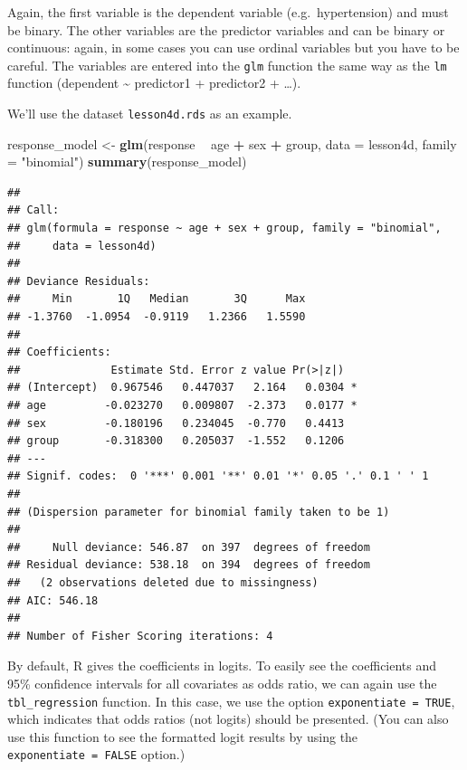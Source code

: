 \documentclass[]{book}
\newenvironment{Shaded}{\begin{snugshade}}{\end{snugshade}}
\newcommand{\DataTypeTok}[1]{\textcolor[rgb]{0.13,0.29,0.53}{#1}}
\newcommand{\KeywordTok}[1]{\textcolor[rgb]{0.13,0.29,0.53}{\textbf{#1}}}
\newcommand{\NormalTok}[1]{#1}
\newcommand{\OperatorTok}[1]{\textcolor[rgb]{0.81,0.36,0.00}{\textbf{#1}}}
\newcommand{\StringTok}[1]{\textcolor[rgb]{0.31,0.60,0.02}{#1}}
\begin{document}
Again, the first variable is the dependent variable (e.g.~hypertension) and must be binary. The other variables are the predictor variables and can be binary or continuous: again, in some cases you can use ordinal variables but you have to be careful. The variables are entered into the \texttt{glm} function the same way as the \texttt{lm} function (dependent \textasciitilde{} predictor1 + predictor2 + \ldots).

We'll use the dataset \texttt{lesson4d.rds} as an example.

\begin{Shaded}
\begin{Highlighting}[]
\NormalTok{response_model <-}\StringTok{ }\KeywordTok{glm}\NormalTok{(response }\OperatorTok{~}\StringTok{ }\NormalTok{age }\OperatorTok{+}\StringTok{ }\NormalTok{sex }\OperatorTok{+}\StringTok{ }\NormalTok{group, }\DataTypeTok{data =}\NormalTok{ lesson4d, }\DataTypeTok{family =} \StringTok{"binomial"}\NormalTok{)}
\KeywordTok{summary}\NormalTok{(response_model)}
\end{Highlighting}
\end{Shaded}

\begin{verbatim}
## 
## Call:
## glm(formula = response ~ age + sex + group, family = "binomial", 
##     data = lesson4d)
## 
## Deviance Residuals: 
##     Min       1Q   Median       3Q      Max  
## -1.3760  -1.0954  -0.9119   1.2366   1.5590  
## 
## Coefficients:
##              Estimate Std. Error z value Pr(>|z|)  
## (Intercept)  0.967546   0.447037   2.164   0.0304 *
## age         -0.023270   0.009807  -2.373   0.0177 *
## sex         -0.180196   0.234045  -0.770   0.4413  
## group       -0.318300   0.205037  -1.552   0.1206  
## ---
## Signif. codes:  0 '***' 0.001 '**' 0.01 '*' 0.05 '.' 0.1 ' ' 1
## 
## (Dispersion parameter for binomial family taken to be 1)
## 
##     Null deviance: 546.87  on 397  degrees of freedom
## Residual deviance: 538.18  on 394  degrees of freedom
##   (2 observations deleted due to missingness)
## AIC: 546.18
## 
## Number of Fisher Scoring iterations: 4
\end{verbatim}

By default, R gives the coefficients in logits. To easily see the coefficients and 95\% confidence intervals for all covariates as odds ratio, we can again use the \texttt{tbl\_regression} function. In this case, we use the option \texttt{exponentiate\ =\ TRUE}, which indicates that odds ratios (not logits) should be presented. (You can also use this function to see the formatted logit results by using the \texttt{exponentiate\ =\ FALSE} option.)
\end{document}
